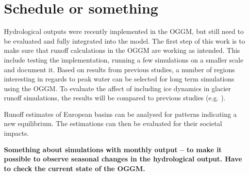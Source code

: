 \documentclass[12pt, a4paper]{article}
\begin{document}
\section{Schedule or something}
Hydrological outputs were recently implemented in the OGGM, but still need to be
evaluated and fully integrated into the model. The first step of this work is to
make sure that runoff calculations in the OGGM are working as intended. This
include testing the implementation, running a few simulations on a smaller scale
and document it. Based on results from previous studies, a number of regions
interesting in regards to peak water can be selected for long term simulations
using the OGGM. To evaluate the affect of including ice dynamics in glacier
runoff simulations, the results will be compared to previous studies (e.g.
\cite{rounceGlacierMassChange2020,hussGlobalscaleHydrologicalResponse2018}). 

Runoff estimates of European basins can be analysed for patterns indicating a
new equilibrium. The estimations can then be evaluated for their societal
impacts.

\textbf{Something about simulations with monthly output -- to make it possible to observe seasonal changes in the hydrological output. Have to check the current state of the OGGM.}



\printbibliography
\end{document}
